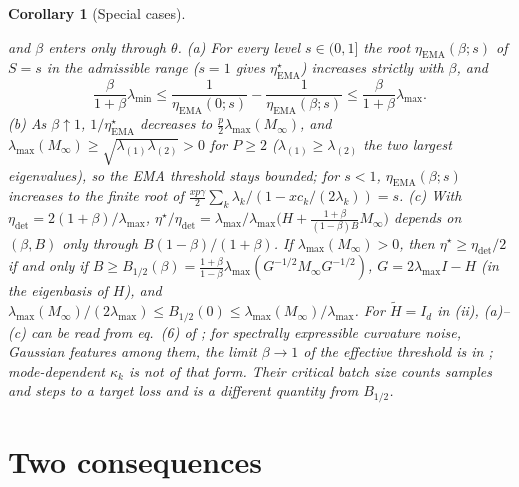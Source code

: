 \documentclass[11pt]{article}
\newtheorem{corollary}[theorem]{Corollary}
\theoremstyle{remark}
\begin{document}
\begin{corollary}[Special cases]
\begin{enumerate}
\[\]
and $\beta$ enters only through $\theta$. (a) For every level $s\in(0,1]$ the root $\eta_{\mathrm{EMA}}(\beta;s)$ of $S=s$ in the admissible range ($s=1$ gives $\eta^\star_{\mathrm{EMA}}$) increases strictly with $\beta$, and
\[
\frac{\beta}{1+\beta}\lambda_{\min}\le\frac1{\eta_{\mathrm{EMA}}(0;s)}-\frac1{\eta_{\mathrm{EMA}}(\beta;s)}\le\frac{\beta}{1+\beta}\lambda_{\max}.
\]
(b) As $\beta\uparrow1$, $1/\eta^\star_{\mathrm{EMA}}$ decreases to $\frac p2\lambda_{\max}(M_\infty)$, and $\lambda_{\max}(M_\infty)\ge\sqrt{\lambda_{(1)}\lambda_{(2)}}>0$ for $P\ge2$ ($\lambda_{(1)}\ge\lambda_{(2)}$ the two largest eigenvalues), so the EMA threshold stays bounded; for $s<1$, $\eta_{\mathrm{EMA}}(\beta;s)$ increases to the finite root of $\frac{xp\gamma}{2}\sum_k\lambda_k/(1-xc_k/(2\lambda_k))=s$. (c) With $\eta_{\mathrm{det}}=2(1+\beta)/\lambda_{\max}$, $\eta^\star/\eta_{\mathrm{det}}=\lambda_{\max}/\lambda_{\max}\big(H+\frac{1+\beta}{(1-\beta)B}M_\infty\big)$ depends on $(\beta,B)$ only through $B(1-\beta)/(1+\beta)$. If $\lambda_{\max}(M_\infty)>0$, then $\eta^\star\ge\eta_{\mathrm{det}}/2$ if and only if $B\ge B_{1/2}(\beta)=\frac{1+\beta}{1-\beta}\lambda_{\max}(G^{-1/2}M_\infty G^{-1/2})$, $G=2\lambda_{\max}I-H$ (in the eigenbasis of $H$), and $\lambda_{\max}(M_\infty)/(2\lambda_{\max})\le B_{1/2}(0)\le\lambda_{\max}(M_\infty)/\lambda_{\max}$.
For $\tilde H=I_d$ in (ii), (a)--(c) can be read from eq.~(6) of \citet{everett2026sparse}; for spectrally expressible curvature noise, Gaussian features among them, the limit $\beta\to1$ of the effective threshold is in \citet[eq.~(23)]{velikanov2023view}; mode-dependent $\kappa_k$ is not of that form. Their critical batch size \citep[Proposition~2]{everett2026sparse} counts samples and steps to a target loss and is a different quantity from $B_{1/2}$.
\end{enumerate}
\end{corollary}

\section{Two consequences}\label{sec:cons}
\end{document}

